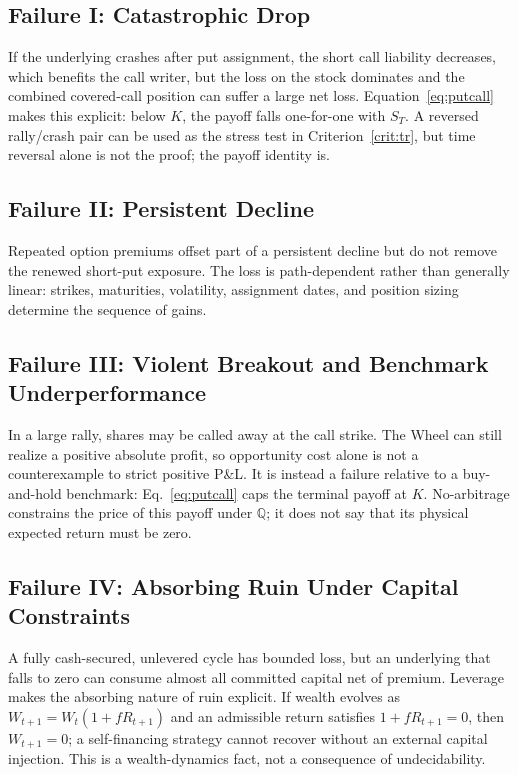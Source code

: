 \documentclass[aps,pra,reprint,superscriptaddress,amsmath,amssymb,floatfix]{revtex4-2}
\theoremstyle{plain}
\theoremstyle{definition}
\theoremstyle{remark}
\begin{document}
\subsection{Failure I: Catastrophic Drop}

If the underlying crashes after put assignment, the short call liability
decreases, which benefits the call writer, but the loss on the stock dominates
and the combined covered-call position can suffer a large net loss.
Equation~\eqref{eq:putcall} makes this explicit: below \(K\), the payoff falls
one-for-one with \(S_T\). A reversed rally/crash pair can be used as the stress
test in Criterion~\ref{crit:tr}, but time reversal alone is not the proof; the
payoff identity is.

\subsection{Failure II: Persistent Decline}

Repeated option premiums offset part of a persistent decline but do not remove
the renewed short-put exposure. The loss is path-dependent rather than
generally linear: strikes, maturities, volatility, assignment dates, and
position sizing determine the sequence of gains.

\subsection{Failure III: Violent Breakout and Benchmark Underperformance}

In a large rally, shares may be called away at the call strike. The Wheel can
still realize a positive absolute profit, so opportunity cost alone is not a
counterexample to strict positive P\&L. It is instead a failure relative to a
buy-and-hold benchmark: Eq.~\eqref{eq:putcall} caps the terminal payoff at
\(K\). No-arbitrage constrains the price of this payoff under
\(\mathbb{Q}\); it does not say that its physical expected return must be zero.

\subsection{Failure IV: Absorbing Ruin Under Capital Constraints}

A fully cash-secured, unlevered cycle has bounded loss, but an underlying that
falls to zero can consume almost all committed capital net of premium.
Leverage makes the absorbing nature of ruin explicit. If wealth evolves as
\(W_{t+1}=W_t(1+fR_{t+1})\) and an admissible return satisfies
\(1+fR_{t+1}=0\), then \(W_{t+1}=0\); a self-financing strategy cannot recover
without an external capital injection. This is a wealth-dynamics fact, not a
consequence of undecidability.
\end{document}
